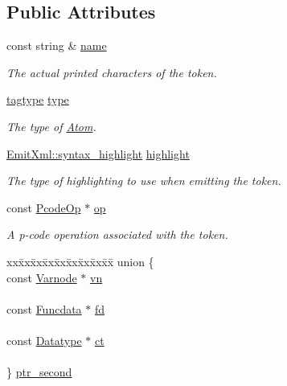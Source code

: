 \subsection*{Public Attributes}
\begin{DoxyCompactItemize}
\item 
const string \& \mbox{\hyperlink{struct_print_language_1_1_atom_a1956638b6944bf2c4ad7e4a0dc60a64c}{name}}
\begin{DoxyCompactList}\small\item\em The actual printed characters of the token. \end{DoxyCompactList}\item 
\mbox{\hyperlink{class_print_language_a7102f70f47777d8b17af52c5157c473e}{tagtype}} \mbox{\hyperlink{struct_print_language_1_1_atom_a726e891470417405fc6259bfbb2f17b4}{type}}
\begin{DoxyCompactList}\small\item\em The type of \mbox{\hyperlink{struct_print_language_1_1_atom}{Atom}}. \end{DoxyCompactList}\item 
\mbox{\hyperlink{class_emit_xml_a7c3577436da429c3c75f4b82cac6864f}{Emit\+Xml\+::syntax\+\_\+highlight}} \mbox{\hyperlink{struct_print_language_1_1_atom_a10935ca44f3a8ba38874d4d8fd052106}{highlight}}
\begin{DoxyCompactList}\small\item\em The type of highlighting to use when emitting the token. \end{DoxyCompactList}\item 
const \mbox{\hyperlink{class_pcode_op}{Pcode\+Op}} $\ast$ \mbox{\hyperlink{struct_print_language_1_1_atom_a65bc578109e6142a7a88b992f409093a}{op}}
\begin{DoxyCompactList}\small\item\em A p-\/code operation associated with the token. \end{DoxyCompactList}\item 
\begin{tabbing}
xx\=xx\=xx\=xx\=xx\=xx\=xx\=xx\=xx\=\kill
union \{\\
\>const \mbox{\hyperlink{class_varnode}{Varnode}} $\ast$ \mbox{\hyperlink{struct_print_language_1_1_atom_a0dea44d33527d1af476eba9e398fb39e}{vn}}\\
\>\\
\>const \mbox{\hyperlink{class_funcdata}{Funcdata}} $\ast$ \mbox{\hyperlink{struct_print_language_1_1_atom_ae49c0974aa418e7f84d9ce686ddf7198}{fd}}\\
\>\\
\>const \mbox{\hyperlink{class_datatype}{Datatype}} $\ast$ \mbox{\hyperlink{struct_print_language_1_1_atom_ae9e9b65a722c2e164e68b9570db3a695}{ct}}\\
\>\\
\} \mbox{\hyperlink{struct_print_language_1_1_atom_a1b69a38395efd1a84cc657cd0eea5cba}{ptr\_second}}\\


\end{tabbing}
\end{DoxyCompactItemize}

